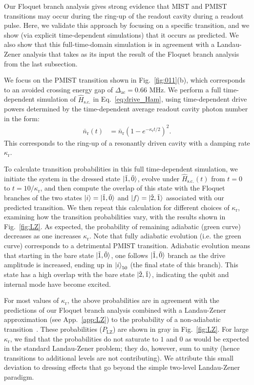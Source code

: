 \documentclass[%
reprint,
superscriptaddress,
 amsmath,amssymb,
 aps,
 prx,
longbibliography,
floatfix,
]{revtex4-2}
\begin{document}
Our Floquet branch analysis gives strong evidence that MIST and PMIST transitions may occur during the ring-up of the readout cavity during a readout pulse.  Here, we validate this approach by focusing on a specific transition, and we show (via explicit time-dependent simulations) that it occurs as predicted.  We also show that this full-time-domain simulation is in agreement with a Landau-Zener analysis that takes as its input the result of the Floquet branch analysis from the last subsection.  

We focus on the PMIST transition shown in Fig.~\ref{fig:011}(b), which corresponds to an avoided crossing energy gap of $\Delta_\textrm{ac}=0.66$ MHz. We perform a full time-dependent simulation of $\hat H_\textrm{s.c.}$ in Eq.~\ref{eq:drive_Ham}, using time-dependent drive powers determined by the time-dependent average readout cavity photon number in the form:
\begin{align}
    \bar n_\textrm{r}(t)&=\bar n_\textrm{r}(1-e^{-\kappa_\textrm{r} t/2})^2.\label{eq:LZ-n}
\end{align}
This corresponds to the ring-up of a resonantly driven cavity with a damping rate $\kappa_\textrm{r}$.

To calculate transition probabilities in this full time-dependent simulation, we initiate the system in the dressed state $\ket{\tilde{1},\tilde{0}}$, evolve under $\hat{H}_\textrm{s.c.}(t)$ from $t=0$ to $t=10 / \kappa_\textrm{r}$, and then compute the overlap of this state with the Floquet branches of the two states $\ket{i}=\ket{\tilde{1},\tilde{0}}$ and $\ket{f}=\ket{\tilde{2},\tilde{1}}$ associated with our predicted transition. We then repeat this calculation for different choices of $\kappa_\textrm{r}$, examining how the transition probabilities vary, with the results shown in Fig.~\ref{fig:LZ}. As expected, the probability of remaining adiabatic (green curve) decreases as one increases $\kappa_\textrm{r}$. Note that fully adiabatic evolution (i.e. the green curve) corresponds to a detrimental PMIST transition.  Adiabatic evolution means that starting in the bare state $\ket{\tilde{1},\tilde{0}}$, one follows $\ket{\tilde{1},\tilde{0}}$ branch as the drive amplitude is increased, ending up in $\ket{i}_{50}$ (the final state of this branch).  This state has a high overlap with the bare state $\ket{\tilde{2},\tilde{1}}$, indicating the qubit and internal mode have become excited. 


For most values of $\kappa_\mathrm{r}$, the above probabilities are in agreement with the predictions of our Floquet branch analysis combined with a Landau-Zener approximation (see App.~\ref{app:LZ}) to the probability of a non-adiabatic transition~\cite{ikeda2022floquet,dumas2024unified}. These probabilities ($P_{\mathrm{LZ}}$) are shown in gray in Fig.~\ref{fig:LZ}. For large $\kappa_\textrm{r}$, we find that the probabilities do not saturate to $1$ and $0$ as would be expected in the standard Landau-Zener problem; they do, however, sum to unity (hence transitions to additional levels are not contributing). We attribute this small deviation to dressing effects that go beyond the simple two-level Landau-Zener paradigm.
\end{document}

